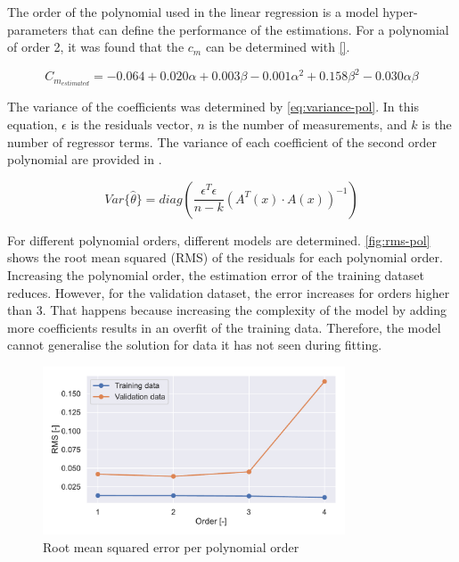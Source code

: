 The order of the polynomial used in the linear regression is a model hyper-parameters that can define the performance of the estimations. For a polynomial of order 2, it was found that the $c_m$ can be determined with  \autoref{}.

\begin{equation}
	C_{m_{estimated}} = -0.064 + 0.020 \alpha + 0.003 \beta -0.001 \alpha^2 +0.158 \beta^2 -0.030 \alpha \beta
\end{equation}

The variance of the coefficients was determined by \autoref{eq:variance-pol}. In this equation, $\epsilon$ is the residuals vector, $n$ is the number of measurements, and $k$ is the number of regressor terms. The variance of each coefficient of the second order polynomial are provided in .

\begin{equation}\label{eq:variance-pol}
	Var\{\hat{\theta}\} = diag(\frac{\epsilon^T\epsilon}{n-k}(A^T(x)\cdot A(x))^{-1})
\end{equation}

For different polynomial orders, different models are determined. \autoref{fig:rms-pol} shows the root mean squared (RMS) of the residuals for each polynomial order. Increasing the polynomial order, the estimation error of the training dataset reduces. However, for the validation dataset, the error increases for orders higher than 3. That happens because increasing the complexity of the model by adding more coefficients results in an overfit of the training data. Therefore, the model cannot generalise the solution for data it has not seen during fitting. 

\begin{figure}[h]
\centering
  \includegraphics[width=0.8\textwidth]{figures/parameter_estimation_mse}
  \caption{Root mean squared error per polynomial order}
  \label{fig:rms-pol}
\end{figure}

